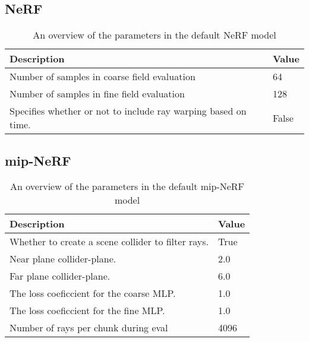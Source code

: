 \subsection{NeRF}
\begin{table}[h]
    \begin{tabular}{|l|l|}
    \hline
    \textbf{Description} & \textbf{Value} \\ 
    \hline
    Number of samples in coarse field evaluation & 64 \\
    Number of samples in fine field evaluation & 128 \\
    Specifies whether or not to include ray warping based on time. & False \\
    \hline
    \end{tabular}
    \caption{An overview of the parameters in the default NeRF model}
    \label{tab:instant-ngp-parameter-overview}
\end{table}

\subsection{mip-NeRF}
\begin{table}[h]
    \begin{tabular}{|l|l|}
    \hline
    \textbf{Description} & \textbf{Value} \\ 
    \hline
    Whether to create a scene collider to filter rays.  & True \\
    Near plane collider-plane.                          & 2.0 \\
    Far plane collider-plane.                           & 6.0 \\
    The loss coeficcient for the coarse MLP.            & 1.0 \\
    The loss coeficcient for the fine MLP.              & 1.0 \\
    Number of rays per chunk during eval                & 4096 \\
    \hline
    \end{tabular}
    \caption{An overview of the parameters in the default mip-NeRF model}
    \label{tab:instant-ngp-parameter-overview}
\end{table}


